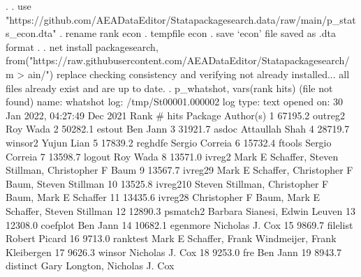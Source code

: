 . 
. use "https://github.com/AEADataEditor/Statapackagesearch.data/raw/main/p_stats_econ.dta"
{\smallskip}
. rename rank econ
{\smallskip}
. tempfile econ
{\smallskip}
. save `econ'
file{} saved as .dta format
{\smallskip}
. 
. net install packagesearch, from("https://raw.githubusercontent.com/AEADataEditor/Statapackagesearch/m
> ain/") replace
checking {} consistency and verifying not already installed...
all files already exist and are up to date.
{\smallskip}
. p_whatshot, vars(rank hits)
(file{} not found)
      name:  whatshot
       log:  /tmp/St00001.000002
  log type:  text
 opened on:  30 Jan 2022, 04:27:49
{\smallskip}
{}
{\smallskip}
        Dec 2021   
  Rank   \# hits    Package       Author(s)
     1  67195.2    outreg2       Roy Wada                                
     2  50282.1    estout        Ben Jann                                
     3  31921.7    asdoc         Attaullah Shah                          
     4  28719.7    winsor2       Yujun Lian                              
     5  17839.2    reghdfe       Sergio Correia                          
     6  15732.4    ftools        Sergio Correia                          
     7  13598.7    logout        Roy Wada                                
     8  13571.0    ivreg2        Mark E Schaffer, Steven Stillman,       
                                   Christopher F Baum                      
     9  13567.7    ivreg29       Mark E Schaffer, Christopher F Baum,    
                                   Steven Stillman                         
    10  13525.8    ivreg210      Steven Stillman, Christopher F Baum,    
                                   Mark E Schaffer                         
    11  13435.6    ivreg28       Christopher F Baum, Mark E Schaffer,    
                                   Steven Stillman                         
    12  12890.3    psmatch2      Barbara Sianesi, Edwin Leuven           
    13  12308.0    coefplot      Ben Jann                                
    14  10682.1    egenmore      Nicholas J. Cox                         
    15   9869.7    filelist      Robert Picard                           
    16   9713.0    ranktest      Mark E Schaffer, Frank Windmeijer,      
                                   Frank Kleibergen                        
    17   9626.3    winsor        Nicholas J. Cox                         
    18   9253.0    fre           Ben Jann                                
    19   8943.7    distinct      Gary Longton, Nicholas J. Cox           
